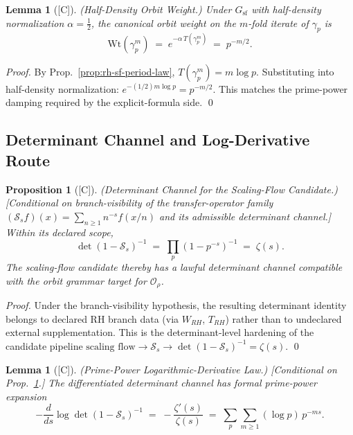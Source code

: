 \documentclass[12pt,oneside]{amsbook}
\theoremstyle{plain}
\newtheorem{lemma}[theorem]{Lemma}
\newtheorem{proposition}[theorem]{Proposition}
\theoremstyle{definition}
\theoremstyle{remark}
\newcommand{\status}[1]{\textup{[#1]}}
\begin{document}
\begin{lemma}[\status{C}]\label{lem:rh-sf-half-density-weight}
\textup{(Half-Density Orbit Weight.)}
Under $G_{\mathrm{sf}}$ with half-density normalization $\alpha =
\tfrac{1}{2}$, the canonical orbit weight on the $m$-fold iterate of
$\gamma_p$ is
\[
 \mathrm{Wt}(\gamma_p^m)
 \;=\; e^{-\alpha\,T(\gamma_p^m)}
 \;=\; p^{-m/2}.
\]
\end{lemma}

\begin{proof}
By Prop.~\ref{prop:rh-sf-period-law}, $T(\gamma_p^m) = m\log p$.
Substituting into half-density normalization:
$e^{-(1/2)m\log p} = p^{-m/2}$. This matches the prime-power
damping required by the explicit-formula side. \qed
\end{proof}

\subsection{Determinant Channel and Log-Derivative Route}

\begin{proposition}[\status{C}]\label{prop:rh-sf-det-euler}
\textup{(Determinant Channel for the Scaling-Flow Candidate.)}
\textup{[Conditional on branch-visibility of the transfer-operator
family $(\mathcal{S}_s f)(x) = \sum_{n\geq 1} n^{-s} f(x/n)$ and
its admissible determinant channel.]}
Within its declared scope,
\[
 \det(1 - \mathcal{S}_s)^{-1}
 \;=\; \prod_p (1-p^{-s})^{-1}
 \;=\; \zeta(s).
\]
The scaling-flow candidate thereby has a lawful determinant channel
compatible with the orbit grammar target for $\mathcal{O}_\rho$.
\end{proposition}

\begin{proof}
Under the branch-visibility hypothesis, the resulting determinant
identity belongs to declared RH branch data
(via $W_{RH}$, $T_{RH}$) rather than to undeclared external
supplementation. This is the determinant-level hardening of the
candidate pipeline
$\text{scaling flow} \to \mathcal{S}_s \to
\det(1-\mathcal{S}_s)^{-1} = \zeta(s)$. \qed
\end{proof}

\begin{lemma}[\status{C}]\label{lem:rh-sf-primepower-logderiv}
\textup{(Prime-Power Logarithmic-Derivative Law.)}
\textup{[Conditional on Prop.~\ref{prop:rh-sf-det-euler}.]}
The differentiated determinant channel has formal prime-power
expansion
\[
 -\frac{d}{ds}\log\det(1-\mathcal{S}_s)^{-1}
 \;=\; -\frac{\zeta'(s)}{\zeta(s)}
 \;=\; \sum_p \sum_{m\geq 1} (\log p)\,p^{-ms}.
\]
\end{lemma}
\end{document}
